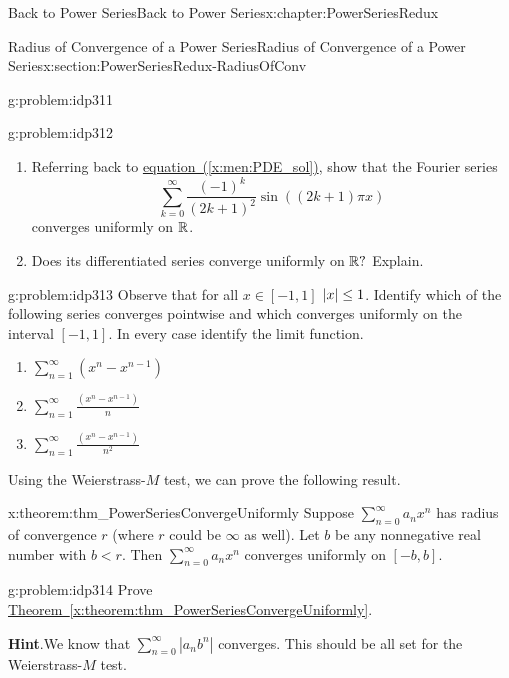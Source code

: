 \begin{chapterptx}{Back to Power Series}{}{Back to Power Series}{}{}{x:chapter:PowerSeriesRedux}
\begin{sectionptx}{Radius of Convergence of a Power Series}{}{Radius of Convergence of a Power Series}{}{}{x:section:PowerSeriesRedux-RadiusOfConv}
\begin{problem}{}{g:problem:idp311}
		\end{problem}
		\begin{problem}{}{g:problem:idp312}%
			\begin{enumerate}[font=\bfseries,label=(\alph*),ref=\alph*]
				\item{}Referring back to \hyperref[x:men:PDE_sol]{equation~({\xreffont\ref{x:men:PDE_sol}})}, show that the Fourier series%
				\begin{equation*}
					\sum_{k=0}^\infty\frac{(-1)^k}{(2k+1)^2}\sin\left((2k+1)\pi x\right)
				\end{equation*}
				converges uniformly on \(\mathbb {R}\).%
				\item{}Does its differentiated series converge uniformly on \(\mathbb {R}?\) Explain.%
			\end{enumerate}
		\end{problem}
		\begin{problem}{}{g:problem:idp313}%
			Observe that for all \(x \in [-1,1]\) \(\left|x\right|\le 1\). Identify which of the following series converges pointwise and which converges uniformly on the interval \([-1,1]\). In every case identify the limit function.%
			\begin{enumerate}[font=\bfseries,label=(\alph*),ref=\alph*]
				\item{}\(\displaystyle \sum_{n=1}^\infty\left(x^n-x^{n-1}\right)\)%
				\item{}\(\displaystyle \sum_{n=1}^\infty\frac{\left(x^n-x^{n-1}\right)}{n}\)%
				\item{}\(\sum_{n=1}^\infty\frac{\left(x^n-x^{n-1}\right)}{n^2}\)%
			\end{enumerate}
		\end{problem}
		Using the Weierstrass-\(M\) test, we can prove the following result.%
		\begin{theorem}{}{}{x:theorem:thm_PowerSeriesConvergeUniformly}%
			 Suppose \(\sum_{n=0}^\infty a_nx^n\) has radius of convergence \(r\) (where \(r\) could be \(\infty\) as well). Let \(b\) be any nonnegative real number with \(b\lt r\). Then \(\sum_{n=0}^\infty a_nx^n\) converges uniformly on \([-b,b]\).%
		\end{theorem}
		\begin{problem}{}{g:problem:idp314}%
			Prove \hyperref[x:theorem:thm_PowerSeriesConvergeUniformly]{Theorem~{\xreffont\ref{x:theorem:thm_PowerSeriesConvergeUniformly}}}.%
			\par\smallskip%
			\noindent\textbf{\blocktitlefont Hint}.\hypertarget{g:hint:idp315}{}\quad{}We know that \(\sum_{n=0}^\infty|a_nb^n|\) converges. This should be all set for the Weierstrass-\(M\) test.%

\end{problem}
\end{sectionptx}
\end{chapterptx}
